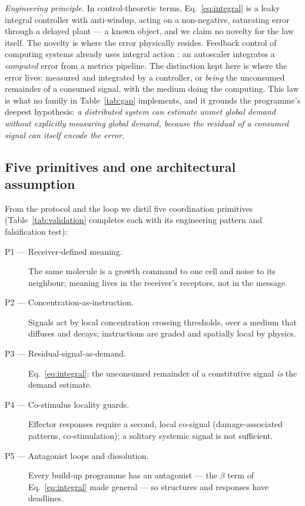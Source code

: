 \documentclass[twoside,twocolumn,usenatbib]{mnras}
\begin{document}
\emph{Engineering principle.} In control-theoretic terms,
Eq.~\ref{eq:integral} is a leaky integral controller with anti-windup,
acting on a non-negative, saturating error through a delayed plant
\citep{astrom2008} --- a known object, and we claim no novelty for the
law itself. The novelty is where the error physically resides.
Feedback control of computing systems
already uses integral action \citep{hellerstein2004}: an autoscaler
integrates a \emph{computed} error from a metrics pipeline. The
distinction kept here is where the error lives: measured and integrated
by a controller, or \emph{being} the unconsumed remainder of a consumed
signal, with the medium doing the computing. This law is what no
family in Table~\ref{tab:gap} implements, and it
grounds the programme's deepest hypothesis: \emph{a distributed system
can estimate unmet global demand without explicitly measuring global
demand, because the residual of a consumed signal can itself encode
the error.}

\subsection{Five primitives and one architectural assumption}
\label{sec:principles}

From the protocol and the loop we distil five coordination primitives
(Table~\ref{tab:validation} completes each with its engineering pattern
and falsification test):

\begin{description}
\item[P1 --- Receiver-defined meaning.] The same molecule is a growth
command to one cell and noise to its neighbour; meaning lives in the
receiver's receptors, not in the message.
\item[P2 --- Concentration-as-instruction.] Signals act by local
concentration crossing thresholds, over a medium that diffuses and
decays; instructions are graded and spatially local by physics.
\item[P3 --- Residual-signal-as-demand.] Eq.~\ref{eq:integral}: the
unconsumed remainder of a constitutive signal \emph{is} the demand
estimate.
\item[P4 --- Co-stimulus locality guards.] Effector responses require
a second, local co-signal (damage-associated patterns,
co-stimulation); a solitary systemic signal is not sufficient.
\item[P5 --- Antagonist loops and dissolution.] Every build-up
programme has an antagonist --- the $\beta$ term of
Eq.~\ref{eq:integral} made general --- so structures and responses
have deadlines.
\end{description}
\end{document}

